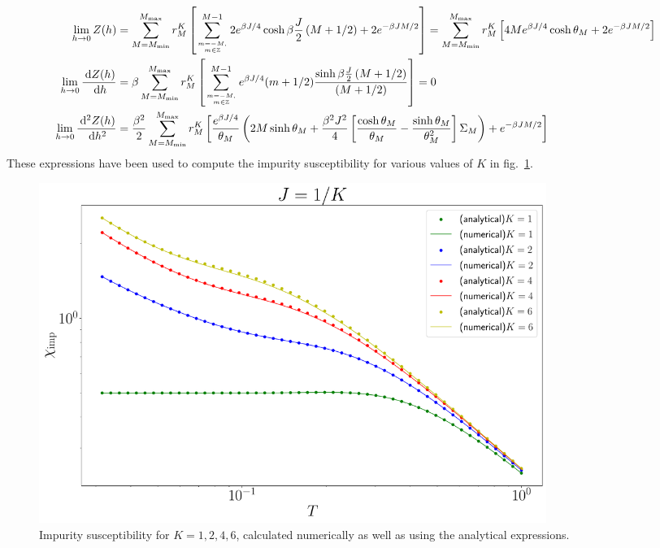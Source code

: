 \documentclass[12pt]{revtex4-2}
\begin{document}
\begin{align}
	\lim_{h \to 0}Z(h) &= \sum_{M=M_\text{min}}^{M_\text{max}}r^K_M\left[\sum_{m=-M, \atop{m\in \mathbb{Z}}}^{M-1}2e^{\beta J/4}\cosh \beta \frac{J}{2}\left( M + 1/2 \right) + 2e^{-\beta JM/2}\right] = \sum_{M=M_\text{min}}^{M_\text{max}}r^K_M\left[4Me^{\beta J/4}\cosh \theta_M + 2e^{-\beta JM/2}\right]\\
	\lim_{h \to 0}\frac{\:\mathrm{d}Z(h)}{\:\mathrm{d}h} &=  \beta\sum_{M=M_\text{min}}^{M_\text{max}}r^K_M\left[\sum_{m=-M, \atop{m\in \mathbb{Z}}}^{M-1}e^{\beta J/4}(m+1/2)\frac{\sinh \beta\frac{J}{2}\left( M + 1/2 \right) }{\left( M + 1/2 \right)}\right] = 0\\
	\lim_{h \to 0}\frac{\:\mathrm{d}^2Z(h)}{\:\mathrm{d}h^2} &= \frac{\beta^2}{2}\sum_{M=M_\text{min}}^{M_\text{max}}r^K_M\left[\frac{e^{\beta J/4}}{\theta_M}\left(2M\sinh \theta_M + \frac{\beta^2 J^2}{4}\left[\frac{\cosh\theta_M}{\theta_M} - \frac{\sinh \theta_M}{\theta_M^2}\right]\Sigma_M\right)+ e^{-\beta JM/2}\right]\\
\end{align}
These expressions have been used to compute the impurity susceptibility for various values of \(K\) in fig.~\ref{chi_mchannel}.
\begin{figure}[htpb]
	\centering
	\includegraphics[width=0.8\textwidth]{../numerics/chi_mchannel.pdf}
	\caption{Impurity susceptibility for \(K=1,2,4,6\), calculated numerically as well as using the analytical expressions.}
	\label{chi_mchannel}
\end{figure}
\end{document}
